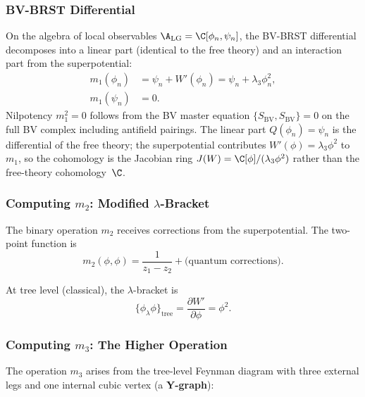 \subsubsection{BV-BRST Differential}

On the algebra of local observables $\A_{\text{LG}} = \C[\phi_n, \psi_n]$, the BV-BRST differential decomposes into a linear part (identical to the free theory) and an interaction part from the superpotential:
\begin{align}
m_1(\phi_n) &= \psi_n + W'(\phi_n) = \psi_n + \lambda_3 \phi_n^2, \label{eq:Q_LG_phi} \\
m_1(\psi_n) &= 0. \label{eq:Q_LG_psi}
\end{align}
Nilpotency $m_1^2 = 0$ follows from the BV master equation $\{S_{\mathrm{BV}}, S_{\mathrm{BV}}\} = 0$ on the full BV complex including antifield pairings. The linear part $Q(\phi_n) = \psi_n$ is the differential of the free theory; the superpotential contributes $W'(\phi) = \lambda_3\phi^2$ to $m_1$, so the cohomology is the Jacobian ring $J(W) = \C[\phi]/(\lambda_3 \phi^2)$ rather than the free-theory cohomology~$\C$.

\subsubsection{Computing $m_2$: Modified $\lambda$-Bracket}

The binary operation $m_2$ receives corrections from the superpotential. The two-point function is
\begin{equation}
m_2(\phi, \phi) = \frac{1}{z_1 - z_2} + \text{(quantum corrections)}.
\end{equation}

At tree level (classical), the $\lambda$-bracket is
\begin{equation}
\{\phi_\lambda \phi\}_{\text{tree}} = \frac{\partial W'}{\partial \phi} = \phi^2.
\end{equation}

\subsubsection{Computing $m_3$: The Higher Operation}

The operation $m_3$ arises from the tree-level Feynman diagram with three external legs and one internal cubic vertex (a \textbf{Y-graph}):

\begin{center}
\end{center}

